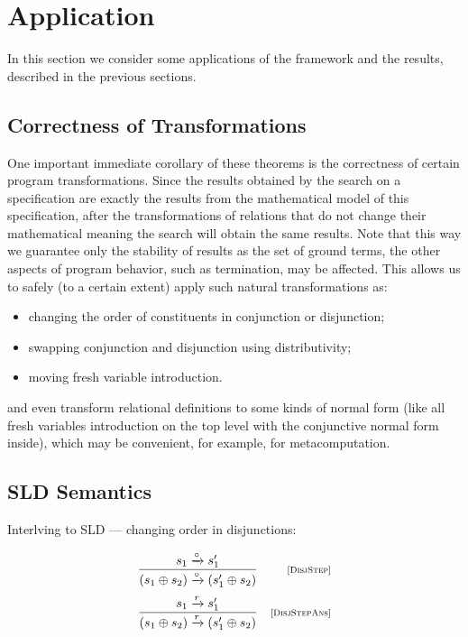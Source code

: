 \section{Application}

In this section we consider some applications of the framework and the results, described in the previous sections.

\subsection{Correctness of Transformations}

One important immediate corollary of these theorems is the correctness of certain program transformations. Since the results obtained by the search on a
specification are exactly the results from the mathematical model of this specification, after the transformations of relations that do not change their
mathematical meaning the search will obtain the same results. Note that this way we guarantee only the stability of results as the set of ground terms,
the other aspects of program behavior, such as termination, may be affected. This allows us to safely (to a certain extent) apply such natural
transformations as:

\begin{itemize}
\item changing the order of constituents in conjunction or disjunction;
\item swapping conjunction and disjunction using distributivity;
\item moving fresh variable introduction.
\end{itemize}

and even transform relational definitions to some kinds of normal form (like all fresh variables introduction on the top level with the
conjunctive normal form inside), which may be convenient, for example, for metacomputation.

\subsection{SLD Semantics}

Interlving to SLD --- changing order in disjunctions:

\[
  \begin{array}{cr}
    \dfrac{s_1 \xrightarrow{\circ} s'_1}{(s_1 \oplus s_2) \xrightarrow{\circ} (s'_1 \oplus s_2)} &\mbox{\scriptsize{[\textsc{DisjStep}]}}\\[5mm]
    \dfrac{s_1 \xrightarrow{r} s'_1}{(s_1 \oplus s_2) \xrightarrow{r} (s'_1 \oplus s_2)} &\mbox{\scriptsize{[\textsc{DisjStepAns}]}}\\[5mm]
  \end{array}
\]

